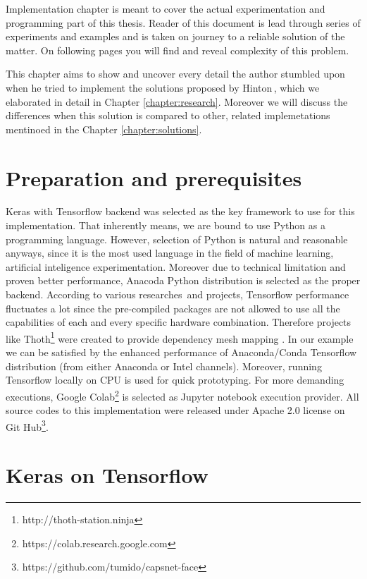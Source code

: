 Implementation chapter is meant to cover the actual experimentation and programming part of this thesis. Reader of this document is lead through series of experiments and examples and is taken on journey to a reliable solution of the matter. On following pages you will find and reveal complexity of this problem.

This chapter aims to show and uncover every detail the author stumbled upon when he tried to implement the solutions proposed by Hinton\,\cite{capsule}, which we elaborated in detail in Chapter \ref{chapter:research}. Moreover we will discuss the differences when this solution is compared to other, related implemetations mentinoed in the Chapter \ref{chapter:solutions}.

\section{Preparation and prerequisites}

Keras with Tensorflow backend was selected as the key framework to use for this implementation. That inherently means, we are bound to use Python as a programming language. However, selection of Python is natural and reasonable anyways, since it is the most used language in the field of machine learning, artificial inteligence experimentation. Moreover due to technical limitation and proven better performance, Anacoda Python distribution is selected as the proper backend. According to various researches\, and projects, Tensorflow performance fluctuates a lot since the pre-compiled packages are not allowed to use all the capabilities of each and every specific hardware combination. Therefore projects like Thoth\footnote{http://thoth-station.ninja} were created to provide dependency mesh mapping . In our example we can be satisfied by the enhanced performance of Anaconda/Conda Tensorflow distribution (from either Anaconda or Intel channels). Moreover, running Tensorflow locally on CPU is used for quick prototyping. For more demanding executions, Google Colab\footnote{https://colab.research.google.com} is selected as Jupyter notebook execution provider. All source codes to this implementation were released under Apache 2.0 license on Git Hub\footnote{https://github.com/tumido/capsnet-face}.

\section{Keras on Tensorflow}

